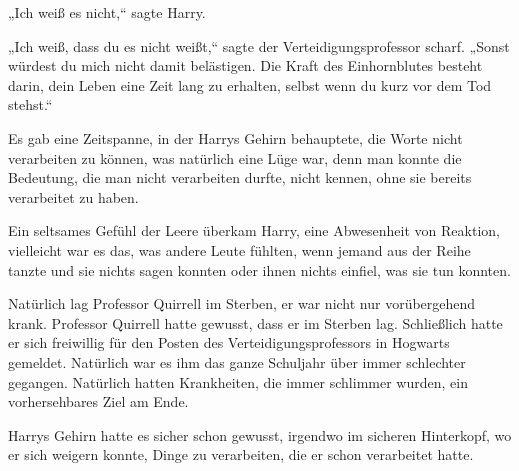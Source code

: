„Ich weiß es nicht,“ sagte Harry.

„Ich weiß, dass du es nicht weißt,“ sagte der Verteidigungsprofessor scharf. „Sonst würdest du mich nicht damit belästigen. Die Kraft des Einhornblutes besteht darin, dein Leben eine Zeit lang zu erhalten, selbst wenn du kurz vor dem Tod stehst.“

Es gab eine Zeitspanne, in der Harrys Gehirn behauptete, die Worte nicht verarbeiten zu können, was natürlich eine Lüge war, denn man konnte die Bedeutung, die man nicht verarbeiten durfte, nicht kennen, ohne sie bereits verarbeitet zu haben.

Ein seltsames Gefühl der Leere überkam Harry, eine Abwesenheit von Reaktion, vielleicht war es das, was andere Leute fühlten, wenn jemand aus der Reihe tanzte und sie nichts sagen konnten oder ihnen nichts einfiel, was sie tun konnten.

Natürlich lag Professor Quirrell im Sterben, er war nicht nur vorübergehend krank. Professor Quirrell hatte gewusst, dass er im Sterben lag. Schließlich hatte er sich freiwillig für den Posten des Verteidigungsprofessors in Hogwarts gemeldet. Natürlich war es ihm das ganze Schuljahr über immer schlechter gegangen. Natürlich hatten Krankheiten, die immer schlimmer wurden, ein vorhersehbares Ziel am Ende.

Harrys Gehirn hatte es sicher schon gewusst, irgendwo im sicheren Hinterkopf, wo er sich weigern konnte, Dinge zu verarbeiten, die er schon verarbeitet hatte.

